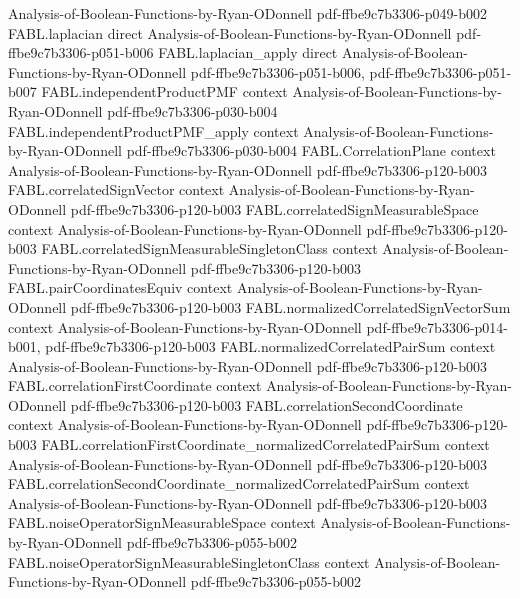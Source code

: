 \begin{theorem}
  {Analysis-of-Boolean-Functions-by-Ryan-ODonnell}
  {pdf-ffbe9c7b3306-p049-b002}
\proofstep
  {FABL.laplacian}
  {direct}
  {Analysis-of-Boolean-Functions-by-Ryan-ODonnell}
  {pdf-ffbe9c7b3306-p051-b006}
\proofstep
  {FABL.laplacian_apply}
  {direct}
  {Analysis-of-Boolean-Functions-by-Ryan-ODonnell}
  {pdf-ffbe9c7b3306-p051-b006,
    pdf-ffbe9c7b3306-p051-b007}
\proofstep
  {FABL.independentProductPMF}
  {context}
  {Analysis-of-Boolean-Functions-by-Ryan-ODonnell}
  {pdf-ffbe9c7b3306-p030-b004}
\proofstep
  {FABL.independentProductPMF_apply}
  {context}
  {Analysis-of-Boolean-Functions-by-Ryan-ODonnell}
  {pdf-ffbe9c7b3306-p030-b004}
\proofstep
  {FABL.CorrelationPlane}
  {context}
  {Analysis-of-Boolean-Functions-by-Ryan-ODonnell}
  {pdf-ffbe9c7b3306-p120-b003}
\proofstep
  {FABL.correlatedSignVector}
  {context}
  {Analysis-of-Boolean-Functions-by-Ryan-ODonnell}
  {pdf-ffbe9c7b3306-p120-b003}
\proofstep
  {FABL.correlatedSignMeasurableSpace}
  {context}
  {Analysis-of-Boolean-Functions-by-Ryan-ODonnell}
  {pdf-ffbe9c7b3306-p120-b003}
\proofstep
  {FABL.correlatedSignMeasurableSingletonClass}
  {context}
  {Analysis-of-Boolean-Functions-by-Ryan-ODonnell}
  {pdf-ffbe9c7b3306-p120-b003}
\proofstep
  {FABL.pairCoordinatesEquiv}
  {context}
  {Analysis-of-Boolean-Functions-by-Ryan-ODonnell}
  {pdf-ffbe9c7b3306-p120-b003}
\proofstep
  {FABL.normalizedCorrelatedSignVectorSum}
  {context}
  {Analysis-of-Boolean-Functions-by-Ryan-ODonnell}
  {pdf-ffbe9c7b3306-p014-b001,
    pdf-ffbe9c7b3306-p120-b003}
\proofstep
  {FABL.normalizedCorrelatedPairSum}
  {context}
  {Analysis-of-Boolean-Functions-by-Ryan-ODonnell}
  {pdf-ffbe9c7b3306-p120-b003}
\proofstep
  {FABL.correlationFirstCoordinate}
  {context}
  {Analysis-of-Boolean-Functions-by-Ryan-ODonnell}
  {pdf-ffbe9c7b3306-p120-b003}
\proofstep
  {FABL.correlationSecondCoordinate}
  {context}
  {Analysis-of-Boolean-Functions-by-Ryan-ODonnell}
  {pdf-ffbe9c7b3306-p120-b003}
\proofstep
  {FABL.correlationFirstCoordinate_normalizedCorrelatedPairSum}
  {context}
  {Analysis-of-Boolean-Functions-by-Ryan-ODonnell}
  {pdf-ffbe9c7b3306-p120-b003}
\proofstep
  {FABL.correlationSecondCoordinate_normalizedCorrelatedPairSum}
  {context}
  {Analysis-of-Boolean-Functions-by-Ryan-ODonnell}
  {pdf-ffbe9c7b3306-p120-b003}
\proofstep
  {FABL.noiseOperatorSignMeasurableSpace}
  {context}
  {Analysis-of-Boolean-Functions-by-Ryan-ODonnell}
  {pdf-ffbe9c7b3306-p055-b002}
\proofstep
  {FABL.noiseOperatorSignMeasurableSingletonClass}
  {context}
  {Analysis-of-Boolean-Functions-by-Ryan-ODonnell}
  {pdf-ffbe9c7b3306-p055-b002}
\proofstep

\end{theorem}

